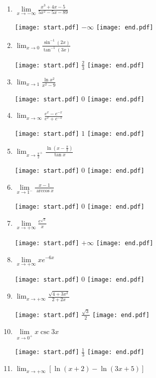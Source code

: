 \documentclass[12pt]{article}
\begin{document}
\begin{enumerate}
\item $\lim\limits_{x\rightarrow -\infty} \frac{x^3+4x-5}{5x^2-5x-89}$  

\texttt{[image: start.pdf]}
{{$-\infty$}}
\texttt{[image: end.pdf]}


\item $\lim_{x \rightarrow 0}{\frac{\sin^{-1}{(2x)}}{\tan^{-1}{(3x)}}}$

\texttt{[image: start.pdf]}
{{$\frac{2}{3}$}}
\texttt{[image: end.pdf]}


\item $\lim_{x \rightarrow 1}{\frac{\ln{x^2}}{x^2-9}}$

\texttt{[image: start.pdf]}
{{$0$}}
\texttt{[image: end.pdf]}


\item $\lim_{x \rightarrow \infty}{\frac{e^x-e^{-x}}{e^x+e^{-x}}}$

\texttt{[image: start.pdf]}
{{$1$}}
\texttt{[image: end.pdf]}


\item $\lim_{x \rightarrow \frac{\pi}{2}^{+}}{\frac{\ln{\left(x-\frac{\pi}{2}\right)}}{\tan{x}}}$

\texttt{[image: start.pdf]}
{{$0$}}
\texttt{[image: end.pdf]}


\item $\lim\limits_{x\rightarrow 1^-} \frac{x-1}{\arccos{x}}$ 

\texttt{[image: start.pdf]}
{{0}}
\texttt{[image: end.pdf]}


\item $\lim\limits_{x\rightarrow +\infty}\frac{e^{\sqrt{x}}}{x}$ 

\texttt{[image: start.pdf]}
{{$+\infty$}}
\texttt{[image: end.pdf]}


\item $\lim\limits_{x\rightarrow +\infty} xe^{-6x}$ 

\texttt{[image: start.pdf]}
{{0}}
\texttt{[image: end.pdf]}


\item $\lim_{x \rightarrow +\infty}{\frac{\sqrt{4+3x^2}}{2+2x}}$

\texttt{[image: start.pdf]}
{{$\frac{\sqrt{3}}{2}$}}
\texttt{[image: end.pdf]}


\item $\lim\limits_{x\rightarrow 0^+} x \csc{3x}$

\texttt{[image: start.pdf]}
{{$\frac{1}{3}$}}
\texttt{[image: end.pdf]}
  

\item $\lim_{x \rightarrow+\infty}\left[\ln{(x+2)}-\ln{(3x+5)}\right]$


\end{enumerate}
\end{document}
